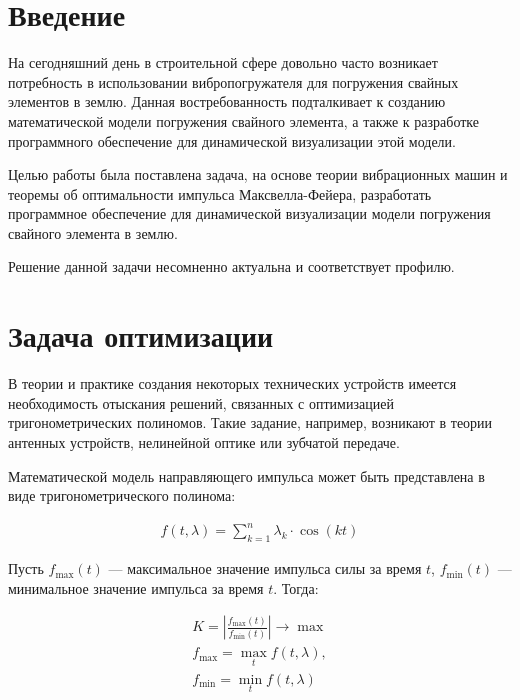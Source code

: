 \section*{Введение}

На сегодняшний день в строительной сфере довольно часто возникает потребность в использовании вибропогружателя для погружения свайных элементов в землю.
Данная востребованность подталкивает к созданию математической модели погружения свайного элемента,
а также к разработке программного обеспечение для динамической визуализации этой модели.

Целью работы была поставлена задача, на основе теории вибрационных машин и теоремы об оптимальности импульса Максвелла-Фейера,
разработать программное обеспечение для динамической визуализации модели погружения свайного элемента в землю.

Решение данной задачи несомненно актуальна и соответствует профилю.

\clearpage
\section{Задача оптимизации}

В теории и практике создания некоторых технических устройств имеется необходимость отыскания решений, связанных с оптимизацией тригонометрических полиномов.
Такие задание, например, возникают в теории антенных устройств, нелинейной оптике или зубчатой передаче.

Математической модель направляющего импульса может быть представлена в виде тригонометрического полинома:

\begin{equation}\label{eq:harmonic_sum}
    \begin{gathered}
        f(t, \lambda) = \sum\limits_{k = 1}^n \lambda_k \cdot \cos(kt)
    \end{gathered}
\end{equation}

Пусть $f_{\max}(t)$ --- максимальное значение импульса силы за время $t$, $f_{\min}(t)$ --- минимальное значение импульса за время $t$. Тогда:

\begin{equation}\label{eq:optim}
    \begin{gathered}
        K = \left| \frac{f_{\max}(t)}{f_{\min}(t)} \right| \rightarrow \max \\
        f_{\max} = \max_t f(t, \lambda),\\
        f_{\min} = \min_t f(t, \lambda)
    \end{gathered}
\end{equation}

